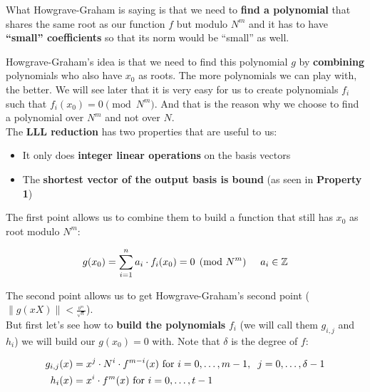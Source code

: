 \documentclass[a4paper,11pt]{article}
\begin{document}
What Howgrave-Graham is saying is that we need to \textbf{find a polynomial} that shares the same root as our function $f$ but modulo $N^m$ and it has to have \textbf{``small'' coefficients} so that its norm would be ``small'' as well.\\


Howgrave-Graham's idea is that we need to find this polynomial $g$ by \textbf{combining} polynomials who also have $x_0$ as roots. The more polynomials we can play with, the better. We will see later that it is very easy for us to create polynomials $f_i$ such that $f_i(x_0) = 0 \pmod{N^m}$. And that is the reason why we choose to find a polynomial over $N^m$ and not over $N$.\\

The \textbf{LLL reduction} has two properties that are useful to us:
\begin{itemize}
	\item{It only does \textbf{integer linear operations} on the basis vectors}
	\item{The \textbf{shortest vector of the output basis is bound} (as seen in \textbf{Property 1})}\\
\end{itemize}
The first point allows us to combine them to build a function that still has $x_0$ as root modulo $N^m$:

\[ g(x_0) = \sum^n_{i=1}a_i\cdot f_i(x_0) = 0 \pmod{N^m}\hspace{5mm} a_i \in \mathbb{Z} \]

The second point allows us to get Howgrave-Graham's second point ($\|g(xX)\| < \frac{_{b^m}}{^{\sqrt{n}}}$).\\

But first let's see how to \textbf{build the polynomials} $f_i$ (we will call them $g_{i,j}$ and $h_i$) we will build our $g(x_0) = 0$ with. Note that $\delta$ is the degree of $f$:

\begin{align*}
	g_{i,j}(x) &= x^j \cdot N^i \cdot f^{m-i}(x) \text{ for } i = 0,\hdots,m-1,\hspace{2mm} j=0,\hdots,\delta-1\\
	h_i(x) &= x^i \cdot f^m(x) \text{ for } i = 0,\hdots,t-1
\end{align*}
\end{document}
